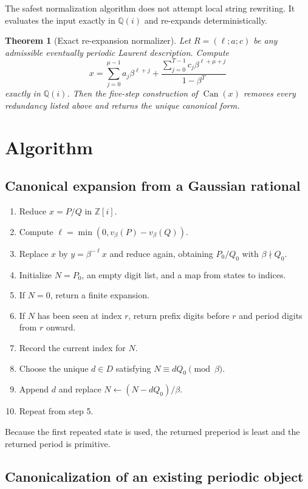 \documentclass[11pt]{article}
\newtheorem{theorem}{Theorem}[section]
\theoremstyle{definition}
\newcommand{\Zi}{\mathbb{Z}[i]}
\newcommand{\Qi}{\mathbb{Q}(i)}
\newcommand{\Can}{\operatorname{Can}}
\begin{document}
The safest normalization algorithm does not attempt local string rewriting.  It evaluates the input exactly in $\Qi$ and re-expands deterministically.

\begin{theorem}[Exact re-expansion normalizer]
Let $R=(\ell;a;c)$ be any admissible eventually periodic Laurent description.  Compute
\[
x=
\sum_{j=0}^{\mu-1}a_j\beta^{\ell+j}
+
\frac{\sum_{j=0}^{T-1}c_j\beta^{\ell+\mu+j}}
{1-\beta^T}
\]
exactly in $\Qi$.  Then the five-step construction of $\Can(x)$ removes every redundancy listed above and returns the unique canonical form.
\end{theorem}

\section{Algorithm}

\subsection{Canonical expansion from a Gaussian rational}

\begin{enumerate}
\item Reduce $x=P/Q$ in $\Zi$.
\item Compute $\ell=\min(0,v_\beta(P)-v_\beta(Q))$.
\item Replace $x$ by $y=\beta^{-\ell}x$ and reduce again, obtaining $P_0/Q_0$ with $\beta\nmid Q_0$.
\item Initialize $N=P_0$, an empty digit list, and a map from states to indices.
\item If $N=0$, return a finite expansion.
\item If $N$ has been seen at index $r$, return prefix digits before $r$ and period digits from $r$ onward.
\item Record the current index for $N$.
\item Choose the unique $d\in D$ satisfying $N\equiv dQ_0\pmod\beta$.
\item Append $d$ and replace $N\leftarrow(N-dQ_0)/\beta$.
\item Repeat from step 5.
\end{enumerate}

Because the first repeated state is used, the returned preperiod is least and the returned period is primitive.

\subsection{Canonicalization of an existing periodic object}
\end{document}
